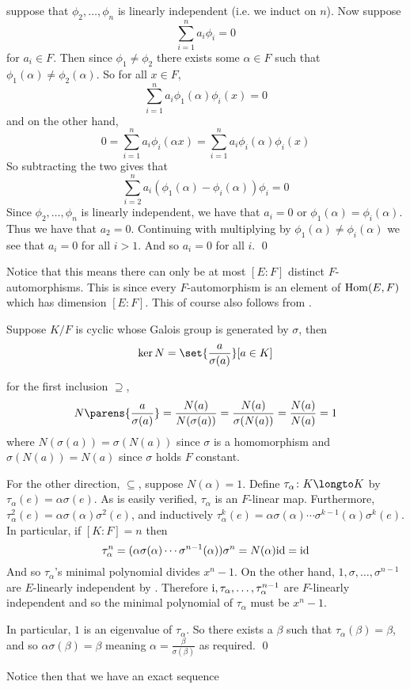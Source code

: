 \Proof suppose that $\phi_2,\dots,\phi_n$ is linearly independent (i.e. we induct on $n$).
Now suppose
$$ \sum_{i=1}^na_i\phi_i = 0 $$
for $a_i\in F$.
Then since $\phi_1\neq\phi_2$ there exists some $\alpha\in F$ such that $\phi_1(\alpha)\neq\phi_2(\alpha)$.
So for all $x\in F$,
$$ \sum_{i=1}^na_i\phi_1(\alpha)\phi_i(x) = 0 $$
and on the other hand,
$$ 0 = \sum_{i=1}^na_i\phi_i(\alpha x) = \sum_{i=1}^na_i\phi_i(\alpha)\phi_i(x) $$
So subtracting the two gives that
$$ \sum_{i=2}^na_i(\phi_1(\alpha)-\phi_i(\alpha))\phi_i = 0 $$
Since $\phi_2,\dots,\phi_n$ is linearly independent, we have that $a_i=0$ or $\phi_1(\alpha)=\phi_i(\alpha)$.
Thus we have that $a_2=0$.
Continuing with multiplying by $\phi_1(\alpha)\neq\phi_i(\alpha)$ we see that $a_i=0$ for all $i>1$.
And so $a_i=0$ for all $i$.
\qed

Notice that this means there can only be at most $[E:F]$ distinct $F$-automorphisms.
This is since every $F$-automorphism is an element of ${\rm Hom}(E,F)$ which has dimension $[E:F]$.
This of course also follows from .

\bthrm[title=Hilbert's Theorem 90, name=hilbert90]

    Suppose $K/F$ is cyclic whose Galois group is generated by $\sigma$, then
    $$ \ker N = \set{\frac a{\sigma(a)}}[a\in K] $$

\ethrm

\Proof for the first inclusion $\supseteq$,
$$ N\parens{\frac a{\sigma(a)}} = \frac{N(a)}{N(\sigma(a))} = \frac{N(a)}{\sigma(N(a))} = \frac{N(a)}{N(a)} = 1 $$
where $N(\sigma(a))=\sigma(N(a))$ since $\sigma$ is a homomorphism and $\sigma(N(a))=N(a)$ since $\sigma$ holds $F$ constant.

For the other direction, $\subseteq$, suppose $N(\alpha)=1$.
Define $\tau_\alpha\colon K\longto K$ by $\tau_\alpha(e)=\alpha\sigma(e)$.
As is easily verified, $\tau_\alpha$ is an $F$-linear map.
Furthermore, $\tau_\alpha^2(e)=\alpha\sigma(\alpha)\sigma^2(e)$, and inductively $\tau_\alpha^k(e)=\alpha\sigma(\alpha)\cdots\sigma^{k-1}(\alpha)\sigma^k(e)$.
In particular, if $[K:F]=n$ then
$$ \tau_\alpha^n = (\alpha\sigma(\alpha)\cdots\sigma^{n-1}(\alpha))\sigma^n = N(\alpha){\rm id} = {\rm id} $$
And so $\tau_\alpha$'s minimal polynomial divides $x^n-1$.
On the other hand, $1,\sigma,\dots,\sigma^{n-1}$ are $E$-linearly independent by .
Therefore ${\rm i},\tau_\alpha,\dots,\tau_\alpha^{n-1}$ are $F$-linearly independent and so the minimal polynomial of $\tau_\alpha$ must be $x^n-1$.

In particular, $1$ is an eigenvalue of $\tau_\alpha$.
So there exists a $\beta$ such that $\tau_\alpha(\beta)=\beta$, and so $\alpha\sigma(\beta)=\beta$ meaning $\alpha=\frac\beta{\sigma(\beta)}$ as required.
\qed

Notice then that we have an exact sequence

\bigskip
\centerline{}
\medskip

